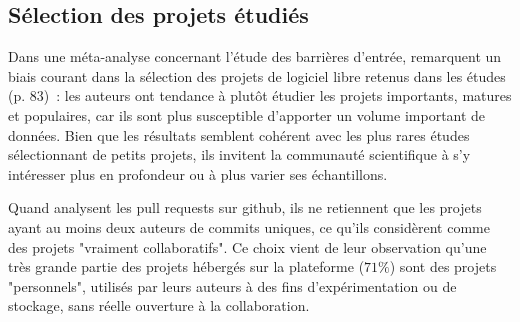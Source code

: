 \subsection{Sélection des projets étudiés}

Dans une méta-analyse concernant l'étude des barrières d'entrée,  remarquent
un biais courant dans la sélection des projets de logiciel libre retenus dans les études (p. 83) : les auteurs
ont tendance à plutôt étudier les projets importants, matures et populaires, car ils sont plus susceptible
d'apporter un volume important de données. Bien que les résultats semblent cohérent avec les plus rares études
sélectionnant de petits projets, ils invitent la communauté scientifique à s'y intéresser plus en profondeur
ou à plus varier ses échantillons.

Quand  analysent les \glspl{pull request} sur \gls{github}, ils ne retiennent
que les projets ayant au moins deux auteurs de \glspl{commit} uniques, ce qu'ils considèrent comme des projets
"vraiment collaboratifs". Ce choix vient de leur observation qu'une très grande partie des projets hébergés
sur la plateforme ($71\%$) sont des projets "personnels", utilisés par leurs auteurs à des fins
d'expérimentation ou de stockage, sans réelle ouverture à la collaboration.
